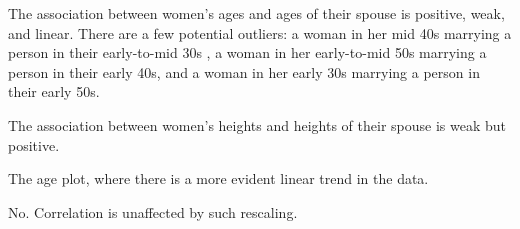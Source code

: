 \begin{parts}
\item The association between women's ages and ages of their spouse is positive, 
weak, and linear. There are a few potential outliers: a woman in her mid 40s marrying a person in their early-to-mid 30s , a woman in her early-to-mid 50s marrying a person in their early 40s, and a woman in her early 30s marrying a person in their early 50s.
\item The association between women's heights and heights of their spouse is weak but 
positive.
\item The age plot, where there is a more evident linear trend in the 
data.
\item No. Correlation is unaffected by such rescaling.
\end{parts}
